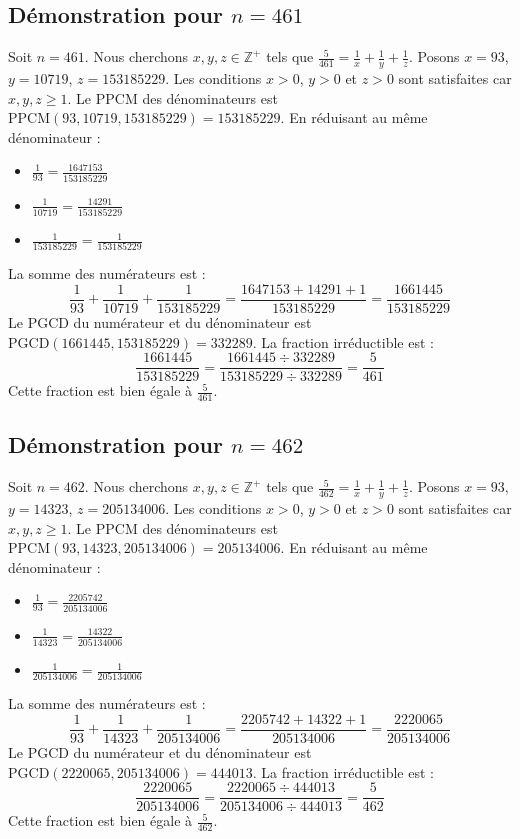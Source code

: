 \documentclass[11pt,a4paper]{article}
\begin{document}
\subsection{Démonstration pour $n = 461$}
Soit $n = 461$. Nous cherchons $x, y, z \in \mathbb{Z}^{+}$ tels que $\frac{5}{461} = \frac{1}{x} + \frac{1}{y} + \frac{1}{z}$.
Posons $x = 93$, $y = 10719$, $z = 153185229$.
Les conditions $x > 0$, $y > 0$ et $z > 0$ sont satisfaites car $x, y, z \geq 1$.
Le PPCM des dénominateurs est $\text{PPCM}(93, 10719, 153185229) = 153185229$.
En réduisant au même dénominateur :
\begin{itemize}
    \item $\frac{1}{93} = \frac{1647153}{153185229}$
    \item $\frac{1}{10719} = \frac{14291}{153185229}$
    \item $\frac{1}{153185229} = \frac{1}{153185229}$
\end{itemize}
La somme des numérateurs est :
$$ \frac{1}{93} + \frac{1}{10719} + \frac{1}{153185229} = \frac{1647153 + 14291 + 1}{153185229} = \frac{1661445}{153185229} $$
Le PGCD du numérateur et du dénominateur est $\text{PGCD}(1661445, 153185229) = 332289$.
La fraction irréductible est :
$$ \frac{1661445}{153185229} = \frac{1661445 \div 332289}{153185229 \div 332289} = \frac{5}{461} $$
Cette fraction est bien égale à $\frac{5}{461}$.

\subsection{Démonstration pour $n = 462$}
Soit $n = 462$. Nous cherchons $x, y, z \in \mathbb{Z}^{+}$ tels que $\frac{5}{462} = \frac{1}{x} + \frac{1}{y} + \frac{1}{z}$.
Posons $x = 93$, $y = 14323$, $z = 205134006$.
Les conditions $x > 0$, $y > 0$ et $z > 0$ sont satisfaites car $x, y, z \geq 1$.
Le PPCM des dénominateurs est $\text{PPCM}(93, 14323, 205134006) = 205134006$.
En réduisant au même dénominateur :
\begin{itemize}
    \item $\frac{1}{93} = \frac{2205742}{205134006}$
    \item $\frac{1}{14323} = \frac{14322}{205134006}$
    \item $\frac{1}{205134006} = \frac{1}{205134006}$
\end{itemize}
La somme des numérateurs est :
$$ \frac{1}{93} + \frac{1}{14323} + \frac{1}{205134006} = \frac{2205742 + 14322 + 1}{205134006} = \frac{2220065}{205134006} $$
Le PGCD du numérateur et du dénominateur est $\text{PGCD}(2220065, 205134006) = 444013$.
La fraction irréductible est :
$$ \frac{2220065}{205134006} = \frac{2220065 \div 444013}{205134006 \div 444013} = \frac{5}{462} $$
Cette fraction est bien égale à $\frac{5}{462}$.
\end{document}
